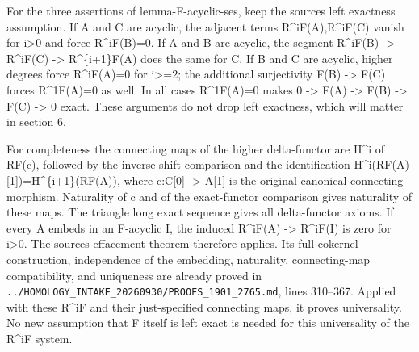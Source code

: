 For the three assertions of lemma-F-acyclic-ses,\allowbreak{} keep the source\textquotesingle s left exactness assumption. If A and C are acyclic,\allowbreak{} the adjacent terms R\textasciicircum{}iF(A)\allowbreak{},\allowbreak{}R\textasciicircum{}iF(C)\allowbreak{} vanish for i\textgreater0 and force R\textasciicircum{}iF(B)\allowbreak{}\allowbreak{}=0. If A and B are acyclic,\allowbreak{} the segment R\textasciicircum{}iF(B)\allowbreak{} \allowbreak{}-> R\textasciicircum{}iF(C)\allowbreak{} \allowbreak{}-> R\textasciicircum{}\{i\allowbreak{}+1\}F(A)\allowbreak{} does the same for C. If B and C are acyclic,\allowbreak{} higher degrees force R\textasciicircum{}iF(A)\allowbreak{}\allowbreak{}=0 for i>\allowbreak{}=2; the additional surjectivity F(B)\allowbreak{} \allowbreak{}-> F(C)\allowbreak{} forces R\textasciicircum{}1F(A)\allowbreak{}\allowbreak{}=0 as well. In all cases R\textasciicircum{}1F(A)\allowbreak{}\allowbreak{}=0 makes 0 \allowbreak{}-> F(A)\allowbreak{} \allowbreak{}-> F(B)\allowbreak{} \allowbreak{}-> F(C)\allowbreak{} \allowbreak{}-> 0 exact. These arguments do not drop left exactness,\allowbreak{} which will matter in section 6.

For completeness the connecting maps of the higher delta-functor are H\^{}i of RF(c)\allowbreak{},\allowbreak{} followed by the inverse shift comparison and the identification H\textasciicircum{}i(RF(A)\allowbreak{}[1]\allowbreak{})\allowbreak{}\allowbreak{}=H\textasciicircum{}\{i\allowbreak{}+1\}(RF(A)\allowbreak{})\allowbreak{},\allowbreak{} where c:\allowbreak{}C[0]\allowbreak{} \allowbreak{}-> A[1]\allowbreak{} is the original canonical connecting morphism. Naturality of c and of the exact-functor comparison gives naturality of these maps. The triangle long exact sequence gives all delta-functor axioms. If every A embeds in an F-acyclic I,\allowbreak{} the induced R\textasciicircum{}iF(A)\allowbreak{} \allowbreak{}-> R\textasciicircum{}iF(I)\allowbreak{} is zero for i\textgreater0. The source\textquotesingle s effacement theorem therefore applies. Its full cokernel construction,\allowbreak{} independence of the embedding,\allowbreak{} naturality,\allowbreak{} connecting-map compatibility,\allowbreak{} and uniqueness are already proved in \texttt{.\allowbreak{}.\allowbreak{}/\allowbreak{}HOMOLOGY\_\allowbreak{}INTAKE\_\allowbreak{}20260930/\allowbreak{}PROOFS\_\allowbreak{}1901\_\allowbreak{}2765.\allowbreak{}md},\allowbreak{} lines 310–\allowbreak{}367. Applied with these R\^{}iF and their just-specified connecting maps,\allowbreak{} it proves universality. No new assumption that F itself is left exact is needed for this universality of the R\^{}iF system.

